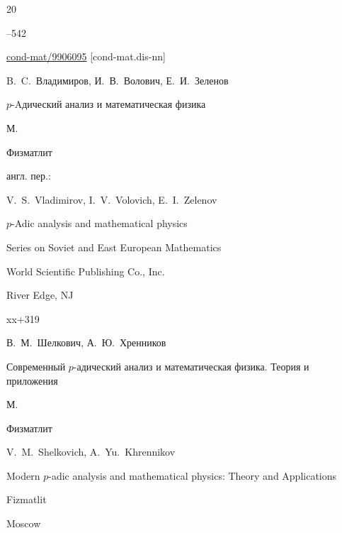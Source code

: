 {\begin{thebibliography}{20}

--542

\arxiv 	\href{http://arxiv.org/abs/cond-mat/9906095}{cond-mat/9906095} [cond-mat.dis-nn]









\by B.~C.~Владимиров, И.~В.~Волович, Е.~И.~Зеленов

\book $p$-Aдический анализ и математическая физика

\publaddr М.

\publ Физматлит



\transl англ. пер.:~

\by V.~S.~Vladimirov, I.~V.~Volovich, E.~I.~Zelenov

\book $p$-Adic analysis and mathematical physics

\serial Series on Soviet and East European Mathematics


\publ World Scientific Publishing Co., Inc.

\publaddr River Edge, NJ


\totalpages xx+319 






\by В.~М.~Шелкович, А.~Ю.~Хренников

\book Современный $p$-адический анализ и математическая физика. Теория и приложения

\publaddr М.

\publ Физматлит



\misctransl 

\by V.~M.~Shelkovich, A.~Yu.~Khrennikov

\book Modern $p$-adic analysis and mathematical physics: Theory and Applications

\publ Fizmatlit

\publaddr Moscow








\end{thebibliography}}
